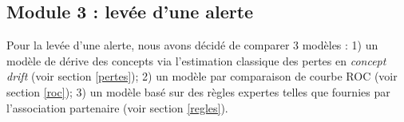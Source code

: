 \subsection{Module 3 : levée d'une alerte}\label{module3}

Pour la levée d'une alerte, nous avons décidé de comparer 3 modèles : 1) un modèle de dérive des concepts via l'estimation classique des pertes  en \textit{concept drift} (voir  section  \ref{pertes}); 2) un modèle par comparaison de courbe ROC (voir  section \ref{roc}); 3)  un modèle basé sur des règles expertes telles que fournies par l'association partenaire (voir  section  \ref{regles}).





